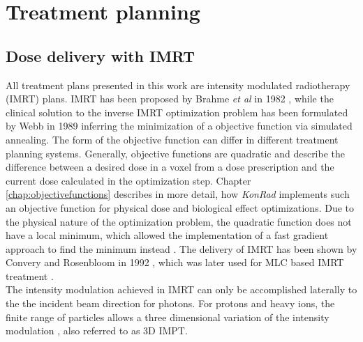 \section{Treatment planning}
\subsection{Dose delivery with IMRT}
All treatment plans presented in this work are intensity modulated radiotherapy (IMRT) plans. IMRT has been proposed by Brahme \textit{et al} in 1982 \cite{pmid7146095}, while the clinical solution to the inverse IMRT optimization problem has been formulated by Webb in 1989 \cite{pmid2682694} inferring the minimization of a objective function via simulated annealing. The form of the objective function can differ in different treatment planning systems. Generally, objective functions are quadratic and describe the difference between a desired dose in a voxel from a dose prescription and the current dose calculated in the optimization step. Chapter \ref{chap:objectivefunctions} describes in more detail, how \textit{KonRad} implements such an objective function for physical dose and biological effect optimizations. Due to the physical nature of the optimization problem, the quadratic function does not have a local minimum, which allowed the implementation of a fast gradient approach to find the minimum instead \cite{pmid2243845}. The delivery of IMRT has been shown by Convery and Rosenbloom in 1992 \cite{Convery_Rosebloom_1992}, which was later used for MLC based IMRT treatment \cite{pmid8690638}. \\The intensity modulation achieved in IMRT can only be accomplished laterally to the the incident beam direction for photons. For protons and heavy ions, the finite range of particles allows a three dimensional variation of the intensity modulation \cite{pmid10071883}, also referred to as 3D IMPT.
